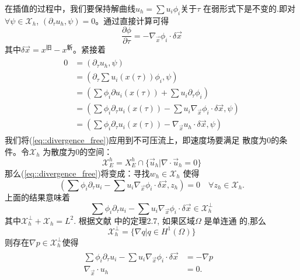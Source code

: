     在插值的过程中，我们要保持解曲线$u_h = \sum u_i \phi_i$关于$\tau$
    在弱形式下是不变的.即对$\forall \psi \in \mathcal{X}_h$,
    $(\partial_{\tau} u_h, \psi) = 0$。通过直接计算可得
    \begin{equation}
      \frac{\partial \phi}{\partial \tau} = -\nabla_{\vec{x}} \phi_i
      \cdot \delta \vec{x}
    \end{equation}
    其中$\delta \vec{x} = x^{\text{旧}} - x^{\text{新}}$。紧接着
    \begin{eqnarray}
      \begin{aligned}
        0 & = (\partial_{\tau} u_h , \psi) \\
        & = (\partial_{\tau} \sum u_i(x(\tau)) \phi_i, \psi) \\
        & = (\sum \phi_i \partial u_i(x(\tau)) + \sum u_i \partial_{\tau}
        \phi_i) \\
        & =  (\sum \phi_i \partial_{\tau} u_i(x(\tau)) -\sum u_i
        \nabla_{\vec{x}}\phi_i \cdot \delta \vec{x}, \psi) \\
        & =  (\sum \phi_i \partial_{\tau} u_i(x(\tau)) - \nabla_{\vec{x}}u_h
        \cdot \delta \vec{x}, \psi)
     \end{aligned}
     \label{eq::divergence_free}
    \end{eqnarray}
    我们将(\ref{eq::divergence_free})应用到不可压流上，即速度场要满足
    散度为0的条件。令$\mathcal{X}_h$ 为散度为0的空间：
    \begin{equation}
      \mathcal{X}_E^h = X_E^h \cap \{\vec{u}_h|\nabla \cdot \vec{u}_h
      = 0 \}
    \end{equation}
    那么(\ref{eq::divergence_free})将变成：寻找$w_h \in
    \mathcal{X}_h$ 使得
    \begin{equation}
      \left( \sum \phi_i \partial_{\tau} u_i - \sum u_i \nabla_{\vec{x}}
      \phi_i \cdot \delta \vec{x}, z_h \right) = 0 \quad \forall z_h
      \in \mathcal{X}_h.
      \label{eq::div_free_space}
    \end{equation}
    上面的结果意味着
    \begin{equation}
      \sum \phi_i \partial_{\tau} u_i - \sum u_i \nabla_{\vec{x}}
      \phi_i \cdot \delta \vec{x} \in \mathcal{X}_h^{\perp}
    \end{equation}
    其中$\mathcal{X}_h^{\perp} + \mathcal{X}_h = L^2$. 根据文献
    \cite{gunzburger2012finite}中的定理2.7, 如果区域$\Omega$ 是单连通
    的,那么
    \begin{equation}
      \mathcal{X}_h^{\perp} = \{ \nabla q | q \in H^1(\Omega) \}
      \label{eq::orthogonal_space}
    \end{equation}
    则存在$\nabla p \in \mathcal{X}_h^{\perp}$使得
    \begin{eqnarray}
      \begin{aligned}
        \sum \phi_i \partial_{\tau} u_i - \sum u_i \nabla_{\vec{x}}
        \phi_i \cdot \delta \vec{x}  &=  -\nabla p &\\
        \nabla_{\vec{x}} \cdot u_h   &=  0.&
      \end{aligned}
      \label{eq::continous_update}
    \end{eqnarray}

